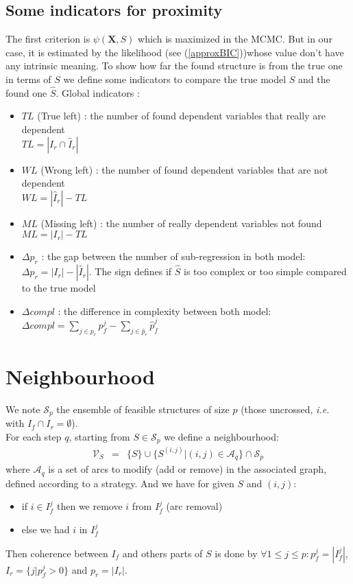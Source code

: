 \documentclass[12pt,a4paper]{report}
\begin{document}
		\subsection{Some indicators for proximity}
		The first criterion is $\psi(\boldsymbol{X},S)$ which is maximized in the MCMC. But in our case, it is estimated by the likelihood (see (\ref{approxBIC}))whose value don't have any intrinsic meaning. To show how far the found structure is from the true one in terms of $S$ we define some indicators to compare the true model $S$ and the found one $\hat{S}$.
			Global indicators :
			\begin{itemize}
				\item $TL$ (True left) : the number of found dependent variables that really are dependent\\ $TL=|I_r\cap \hat{I}_r|$ 
				\item $WL$ (Wrong left) : the number of found dependent variables that are not dependent \\ $WL=|\hat{I}_r|-TL$
				\item $ML$ (Missing left) : the number of really dependent variables not found\\ $ML=|I_r|-TL$
				\item $\Delta p_r$ : the gap between the number of sub-regression in both model: \\ $\Delta p_r=|I_r|-|\hat{I}_r|$. The sign defines if $\hat{S}$ is too complex or too simple compared to the true model
				\item $\Delta compl$ : the difference in complexity between both model: \\$\Delta compl=\sum_{j \in p_r}p_f^j-\sum_{j \in \hat{p}_r}\hat{p}_f^j$
			\end{itemize}
			
			
			
	\section{Neighbourhood}
	We note $\mathcal{S}_p$ the ensemble of feasible structures of size $p$ (those uncrossed, {\it i.e.} with $I_f\cap I_r=\emptyset$).
	\\
	For each step $q$, starting from $S \in \mathcal{S}_p$ we define a neighbourhood:
		\begin{eqnarray}
		\mathcal{V}_{S}&=& \{S \}\cup \{ S^{(i,j)} |(i,j) \in \mathcal{A}_q\}\cap{\mathcal{S}_p} 
	\end{eqnarray}	
	where $\mathcal{A}_q$ is a set of arcs to modify (add or remove) in the associated graph, defined according to a strategy.
	And we have for  given $S$ and $(i,j)$:
	\begin{itemize}
		\item if $i \in I_f^j$ then we remove $i$ from $I_f^j$ (arc removal)
		\item else we had $i$ in $I_f^j$
	\end{itemize} 
	Then coherence between $I_f$ and others parts of $S$ is done by $\forall 1\leq j\leq p :  p_f^j=|I_f^j|$, $I_r=\{j |p_f^j>0 \}$ and $p_r= |I_r|$.
	
\end{document}
